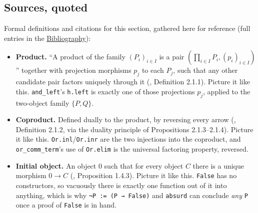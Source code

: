 \subsection{Sources, quoted}\label{sec:04-propositions-and-proofs:05-and-or-not:2}

Formal definitions and citations for this section, gathered here for reference (full entries in the \hyperref[sec:root:bibliography:1]{Bibliography}):

\begin{itemize}
\tightlist
\item
  \textbf{Product.} ``A product of the family \((P_i)_{i \in I}\) is a pair \(\left(\prod_{i \in I} P_i, (p_i)_{i \in I}\right)\)'' together with projection morphisms \(p_j\) to each \(P_j\), such that any other candidate pair factors uniquely through it (\cite{Agore2023}, Definition 2.1.1). Picture it like this. \texttt{and\_\allowbreak{}left}'s \texttt{h.left} is exactly one of those projections \(p_j\), applied to the two-object family \(\{P, Q\}\).
\item
  \textbf{Coproduct.} Defined dually to the product, by reversing every arrow (\cite{Agore2023}, Definition 2.1.2, via the duality principle of Propositions 2.1.3--2.1.4). Picture it like this. \texttt{Or.inl}/\texttt{Or.inr} are the two injections into the coproduct, and \texttt{or\_\allowbreak{}comm\_\allowbreak{}term}'s use of \texttt{Or.elim} is the universal factoring property, reversed.
\item
  \textbf{Initial object.} An object \(0\) such that for every object \(C\) there is a unique morphism \(0 \to C\) (\cite{Agore2023}, Proposition 1.4.3). Picture it like this. \texttt{False} has no constructors, so vacuously there is exactly one function out of it into anything, which is why \texttt{¬P := (P → False)} and \texttt{absurd} can conclude \emph{any} \texttt{P} once a proof of \texttt{False} is in hand.
\end{itemize}
